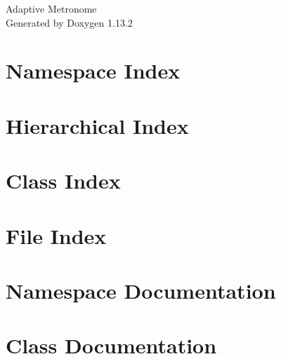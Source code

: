 \documentclass[twoside]{book}
\newcommand{\+}{\discretionary{\mbox{\scriptsize$\hookleftarrow$}}{}{}}
\newcommand{\clearemptydoublepage}{%
    \newpage{\pagestyle{empty}\cleardoublepage}%
  }
\begin{document}
  \raggedbottom
    \hypersetup{pageanchor=false,
                bookmarksnumbered=true,
                pdfencoding=unicode
               }
  \begin{titlepage}
  \vspace*{7cm}
  \begin{center}%
  {\Large Adaptive Metronome}\\
  \vspace*{1cm}
  {\large Generated by Doxygen 1.13.2}\\
  \end{center}
  \end{titlepage}
  \clearemptydoublepage
  \tableofcontents
  \clearemptydoublepage
  \hypersetup{pageanchor=true}
\chapter{Namespace Index}

\chapter{Hierarchical Index}

\chapter{Class Index}

\chapter{File Index}

\chapter{Namespace Documentation}

\chapter{Class Documentation}





















\end{document}
